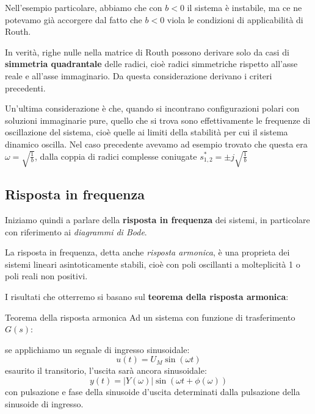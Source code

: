 \documentclass[a4paper,11pt]{article}
\begin{document}
\begin{itemize}
\begin{itemize}
Nell'esempio particolare, abbiamo che con $b<0$ il sistema è instabile, ma ce ne potevamo già accorgere dal fatto che $b<0$ viola le condizioni di applicabilità di Routh.
\end{itemize}

In verità, righe nulle nella matrice di Routh possono derivare solo da casi di \textbf{simmetria quadrantale} delle radici, cioè radici simmetriche rispetto all'asse reale e all'asse immaginario.
Da questa considerazione derivano i criteri precedenti.

Un'ultima considerazione è che, quando si incontrano configurazioni polari con soluzioni immaginarie pure, quello che si trova sono effettivamente le frequenze di oscillazione del sistema, cioè quelle ai limiti della stabilità per cui il sistema dinamico oscilla.
Nel caso precedente avevamo ad esempio trovato che questa era $\omega = \sqrt{\frac{1}{b}}$, dalla coppia di radici complesse coniugate $s^*_{1, 2} = \pm j \sqrt{ \frac{1}{b} }$

\end{itemize}

\subsection{Risposta in frequenza}
Iniziamo quindi a parlare della \textbf{risposta in frequenza} dei sistemi, in particolare con riferimento ai \textit{diagrammi di Bode}.

La risposta in frequenza, detta anche \textit{risposta armonica}, è una proprieta dei sistemi lineari asintoticamente stabili, cioè con poli oscillanti a molteplicità 1 o poli reali non positivi.

\noindent
\begin{minipage}{\textwidth}
I risultati che otterremo si basano sul \textbf{teorema della risposta armonica}:
\begin{theorem}{Teorema della risposta armonica}
Ad un sistema con funzione di trasferimento $G(s)$:
\begin{center}
\end{center}
se applichiamo un segnale di ingresso sinusoidale:
$$
u(t) = U_M \sin(\omega t)
$$
esaurito il transitorio, l'uscita sarà ancora sinusoidale:
$$
y(t) = |Y(\omega)| \sin\left(\omega t + \phi(\omega)\right)
$$
con pulsazione e fase della sinusoide d'uscita determinati dalla pulsazione della sinusoide di ingresso.
\end{theorem}
\end{minipage}
\end{document}
